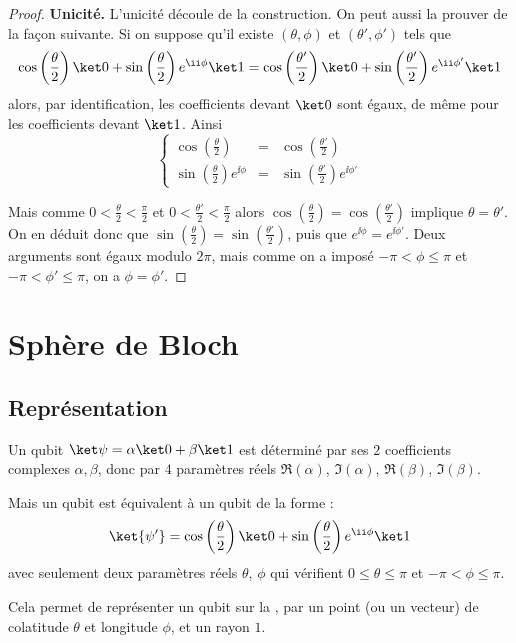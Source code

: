 \documentclass[11pt,class=report,crop=false]{standalone}
\renewcommand{\commentfigure}[1]{#1} %
\begin{document}
\begin{proof}
\bigskip
\textbf{Unicité.}
L'unicité découle de la construction. On peut aussi la prouver de la façon suivante. Si on suppose qu'il existe $(\theta,\phi)$ et $(\theta',\phi')$ tels que
$$\cos\left(\frac\theta2\right)\ket0+ \sin\left(\frac\theta2\right)e^{\ii\phi}\ket1 = \cos\left(\frac{\theta'}2\right)\ket0+ \sin\left(\frac{\theta'}2\right)e^{\ii\phi'}\ket1$$
alors, par identification, les coefficients devant $\ket0$ sont égaux, de même pour les coefficients devant $\ket1$.
Ainsi
$$\left\{\begin{array}{rcl}
\cos(\frac\theta2) &=& \cos(\frac{\theta'}2) \\
\sin(\frac{\theta}2)e^{\ii\phi} &=& \sin(\frac{\theta'}2)e^{\ii\phi'}
\end{array}\right.$$

Mais comme $0 <\frac\theta2< \frac\pi2$ et $0 <\frac{\theta'}{2} < \frac\pi2$ alors
$\cos(\frac\theta2) = \cos(\frac{\theta'}2)$ implique $\theta=\theta'$.
On en déduit donc que $\sin(\frac\theta2) = \sin(\frac{\theta'}2)$,
puis que $e^{\ii\phi} = e^{\ii\phi'}$. Deux arguments sont égaux modulo $2\pi$, mais comme on a imposé 
$-\pi < \phi \le \pi$ et $-\pi < \phi' \le \pi$, on a $\phi=\phi'$.
\end{proof}



\section{Sphère de Bloch}


\subsection{Représentation}

Un qubit $\ket\psi = \alpha\ket0+\beta\ket1$ est déterminé par ses $2$ coefficients complexes $\alpha,\beta$, donc 
par $4$ paramètres réels $\Re(\alpha)$, $\Im(\alpha)$, $\Re(\beta)$, $\Im(\beta)$.

Mais un qubit est équivalent à un qubit de la forme :
$$\ket{\psi'} = \cos\left(\frac\theta2\right)\ket0+ \sin\left(\frac\theta2\right)e^{\ii\phi}\ket1$$
avec seulement deux paramètres réels $\theta$, $\phi$
qui vérifient $0\le \theta \le \pi$ et $-\pi < \phi \le \pi$.

Cela permet de représenter un qubit sur la ,
par un point (ou un vecteur) de colatitude $\theta$ et longitude $\phi$, et un rayon $1$.
\commentfigure{
}
\end{document}
